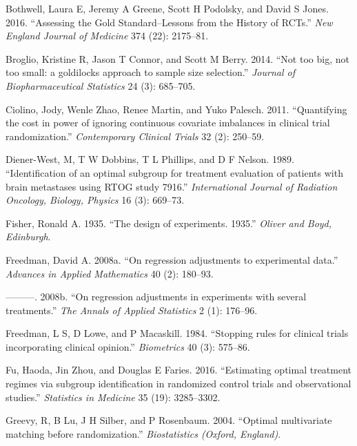 \documentclass[12pt,oneside]{book}
\newlength{\li}\setlength{\li}{14.48pt}
\newlength{\di}\setlength{\di}{-3.5mm}
\theoremstyle{definition}
\theoremstyle{definition}
\theoremstyle{definition}
\theoremstyle{remark}
\begin{document}
\leavevmode\hypertarget{ref-Bothwell:2016bc}{}%
Bothwell, Laura E, Jeremy A Greene, Scott H Podolsky, and David S Jones.
2016. ``Assessing the Gold Standard--Lessons from the History of RCTs.''
\emph{New England Journal of Medicine} 374 (22): 2175--81.

\leavevmode\hypertarget{ref-Broglio:2014fr}{}%
Broglio, Kristine R, Jason T Connor, and Scott M Berry. 2014. ``Not too
big, not too small: a goldilocks approach to sample size selection.''
\emph{Journal of Biopharmaceutical Statistics} 24 (3): 685--705.

\leavevmode\hypertarget{ref-Ciolino:2011ff}{}%
Ciolino, Jody, Wenle Zhao, Renee Martin, and Yuko Palesch. 2011.
``Quantifying the cost in power of ignoring continuous covariate
imbalances in clinical trial randomization.'' \emph{Contemporary
Clinical Trials} 32 (2): 250--59.

\leavevmode\hypertarget{ref-DienerWest:1989uq}{}%
Diener-West, M, T W Dobbins, T L Phillips, and D F Nelson. 1989.
``Identification of an optimal subgroup for treatment evaluation of
patients with brain metastases using RTOG study 7916.''
\emph{International Journal of Radiation Oncology, Biology, Physics} 16
(3): 669--73.

\leavevmode\hypertarget{ref-fisher1935design}{}%
Fisher, Ronald A. 1935. ``The design of experiments. 1935.''
\emph{Oliver and Boyd, Edinburgh}.

\leavevmode\hypertarget{ref-Freedman:2008eq}{}%
Freedman, David A. 2008a. ``On regression adjustments to experimental
data.'' \emph{Advances in Applied Mathematics} 40 (2): 180--93.

\leavevmode\hypertarget{ref-Freedman:2008em}{}%
---------. 2008b. ``On regression adjustments in experiments with
several treatments.'' \emph{The Annals of Applied Statistics} 2 (1):
176--96.

\leavevmode\hypertarget{ref-Freedman:1984wz}{}%
Freedman, L S, D Lowe, and P Macaskill. 1984. ``Stopping rules for
clinical trials incorporating clinical opinion.'' \emph{Biometrics} 40
(3): 575--86.

\leavevmode\hypertarget{ref-Fu:2016jy}{}%
Fu, Haoda, Jin Zhou, and Douglas E Faries. 2016. ``Estimating optimal
treatment regimes via subgroup identification in randomized control
trials and observational studies.'' \emph{Statistics in Medicine} 35
(19): 3285--3302.

\leavevmode\hypertarget{ref-Greevy:2004ke}{}%
Greevy, R, B Lu, J H Silber, and P Rosenbaum. 2004. ``Optimal
multivariate matching before randomization.'' \emph{Biostatistics
(Oxford, England)}.
\end{document}

